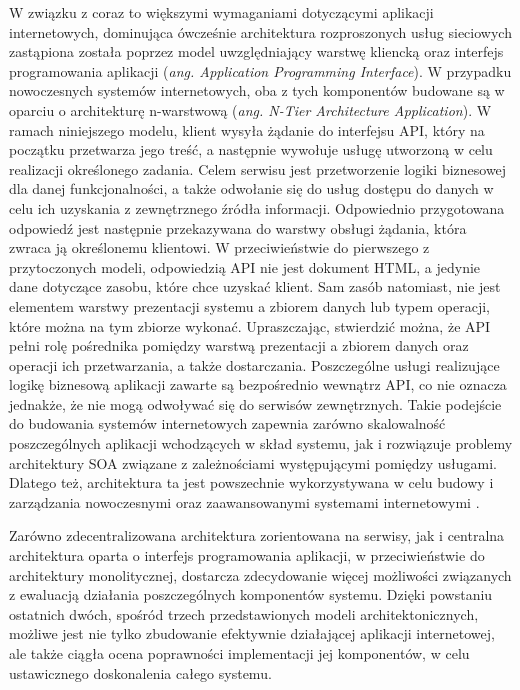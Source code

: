 W związku z coraz to większymi wymaganiami dotyczącymi aplikacji internetowych, dominująca ówcześnie architektura rozproszonych usług sieciowych zastąpiona została poprzez model uwzględniający warstwę kliencką oraz interfejs programowania aplikacji (\textit{ang. Application Programming Interface}). W przypadku nowoczesnych systemów internetowych, oba z tych komponentów budowane są w oparciu o architekturę n-warstwową (\textit{ang. N-Tier Architecture Application}). W ramach niniejszego modelu, klient wysyła żądanie do interfejsu API, który na początku przetwarza jego treść, a następnie wywołuje usługę utworzoną w celu realizacji określonego zadania. Celem serwisu jest przetworzenie logiki biznesowej dla danej funkcjonalności, a także odwołanie się do usług dostępu do danych w celu ich uzyskania z zewnętrznego źródła informacji. Odpowiednio przygotowana odpowiedź jest następnie przekazywana do warstwy obsługi żądania, która zwraca ją określonemu klientowi. W przeciwieństwie do pierwszego z przytoczonych modeli, odpowiedzią API nie jest dokument HTML, a jedynie dane dotyczące zasobu, które chce uzyskać klient. Sam zasób natomiast, nie jest elementem warstwy prezentacji systemu a zbiorem danych lub typem operacji, które można na tym zbiorze wykonać. Upraszczając, stwierdzić można, że API pełni rolę pośrednika pomiędzy warstwą prezentacji a zbiorem danych oraz operacji ich przetwarzania, a także dostarczania. Poszczególne usługi realizujące logikę biznesową aplikacji zawarte są bezpośrednio wewnątrz API, co nie oznacza jednakże, że nie mogą odwoływać się do serwisów zewnętrznych. Takie podejście do budowania systemów internetowych zapewnia zarówno skalowalność poszczególnych aplikacji wchodzących w skład systemu, jak i rozwiązuje problemy architektury SOA związane z zależnościami występującymi pomiędzy usługami. Dlatego też, architektura ta jest powszechnie wykorzystywana w celu budowy i zarządzania nowoczesnymi oraz zaawansowanymi systemami internetowymi \cite{SHENG2014218}.

Zarówno zdecentralizowana architektura zorientowana na serwisy, jak i centralna architektura oparta o interfejs programowania aplikacji, w przeciwieństwie do architektury monolitycznej, dostarcza zdecydowanie więcej możliwości związanych z ewaluacją działania poszczególnych komponentów systemu. Dzięki powstaniu ostatnich dwóch, spośród trzech przedstawionych modeli architektonicznych, możliwe jest nie tylko zbudowanie efektywnie działającej aplikacji internetowej, ale także ciągła ocena poprawności implementacji jej komponentów, w celu ustawicznego doskonalenia całego systemu.

